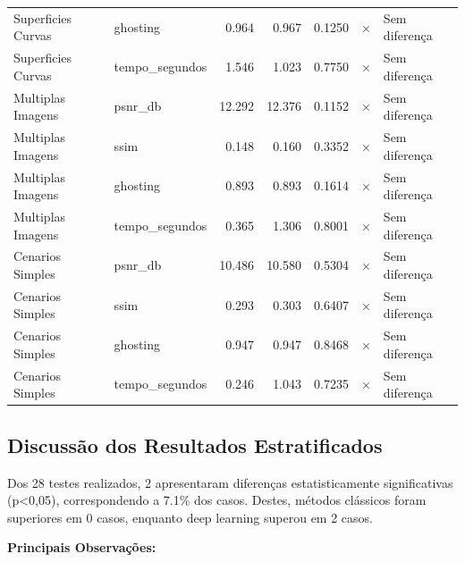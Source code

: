 \begin{table}[htb]
\begin{tabular}{llrrrcp{3cm}}
Superficies Curvas & ghosting & 0.964 & 0.967 & 0.1250 & $\times$ & Sem diferença \\
Superficies Curvas & tempo_segundos & 1.546 & 1.023 & 0.7750 & $\times$ & Sem diferença \\
Multiplas Imagens & psnr_db & 12.292 & 12.376 & 0.1152 & $\times$ & Sem diferença \\
Multiplas Imagens & ssim & 0.148 & 0.160 & 0.3352 & $\times$ & Sem diferença \\
Multiplas Imagens & ghosting & 0.893 & 0.893 & 0.1614 & $\times$ & Sem diferença \\
Multiplas Imagens & tempo_segundos & 0.365 & 1.306 & 0.8001 & $\times$ & Sem diferença \\
Cenarios Simples & psnr_db & 10.486 & 10.580 & 0.5304 & $\times$ & Sem diferença \\
Cenarios Simples & ssim & 0.293 & 0.303 & 0.6407 & $\times$ & Sem diferença \\
Cenarios Simples & ghosting & 0.947 & 0.947 & 0.8468 & $\times$ & Sem diferença \\
Cenarios Simples & tempo_segundos & 0.246 & 1.043 & 0.7235 & $\times$ & Sem diferença \\
\hline
\end{tabular}
\end{table}

\subsection{Discussão dos Resultados Estratificados}

Dos 28 testes realizados, 2 apresentaram diferenças estatisticamente significativas (p<0,05), correspondendo a 7.1\% dos casos. Destes, métodos clássicos foram superiores em 0 casos, enquanto deep learning superou em 2 casos.

\textbf{Principais Observações:}


